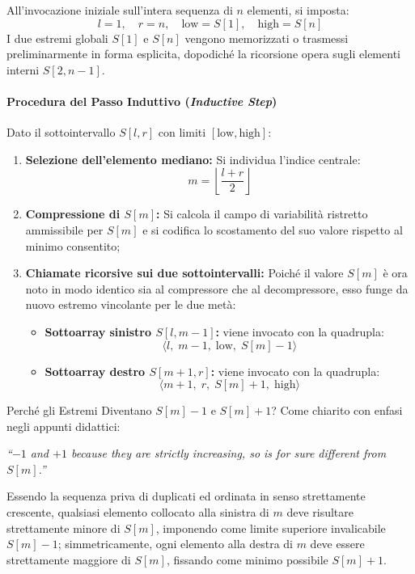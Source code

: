 All'invocazione iniziale sull'intera sequenza di $n$ elementi, si imposta:
\begin{equation}
  l = 1, \quad r = n, \quad \text{low} = S[1], \quad \text{high} = S[n]
\end{equation}
I due estremi globali $S[1]$ e $S[n]$ vengono memorizzati o trasmessi preliminarmente in forma esplicita, dopodich\'e la ricorsione opera sugli elementi interni $S[2, n-1]$.

\paragraph{Procedura del Passo Induttivo (\textit{Inductive Step})}
Dato il sottointervallo $S[l, r]$ con limiti $[\text{low}, \text{high}]$:
\begin{enumerate}
  \item \textbf{Selezione dell'elemento mediano:} Si individua l'indice centrale:
  \begin{equation}
    m = \left\lfloor \frac{l + r}{2} \right\rfloor
  \end{equation}
  \item \textbf{Compressione di $S[m]$:} Si calcola il campo di variabilit\`a ristretto ammissibile per $S[m]$ e si codifica lo scostamento del suo valore rispetto al minimo consentito;
  \item \textbf{Chiamate ricorsive sui due sottointervalli:} Poich\'e il valore $S[m]$ \`e ora noto in modo identico sia al compressore che al decompressore, esso funge da nuovo estremo vincolante per le due met\`a:
  \begin{itemize}
    \item \textbf{Sottoarray sinistro $S[l, m - 1]$:} viene invocato con la quadrupla:
    \begin{equation}
      \langle l, \; m - 1, \; \text{low}, \; S[m] - 1 \rangle
    \end{equation}
    \item \textbf{Sottoarray destro $S[m + 1, r]$:} viene invocato con la quadrupla:
    \begin{equation}
      \langle m + 1, \; r, \; S[m] + 1, \; \text{high} \rangle
    \end{equation}
  \end{itemize}
\end{enumerate}

\begin{noteblock}{Perch\'e gli Estremi Diventano $S[m] - 1$ e $S[m] + 1$?}
Come chiarito con enfasi negli appunti didattici:
\begin{center}
  \textit{``$-1$ and $+1$ because they are strictly increasing, so is for sure different from $S[m]$.''}
\end{center}
Essendo la sequenza priva di duplicati ed ordinata in senso strettamente crescente, qualsiasi elemento collocato alla sinistra di $m$ deve risultare strettamente minore di $S[m]$, imponendo come limite superiore invalicabile $S[m] - 1$; simmetricamente, ogni elemento alla destra di $m$ deve essere strettamente maggiore di $S[m]$, fissando come minimo possibile $S[m] + 1$.
\end{noteblock}

